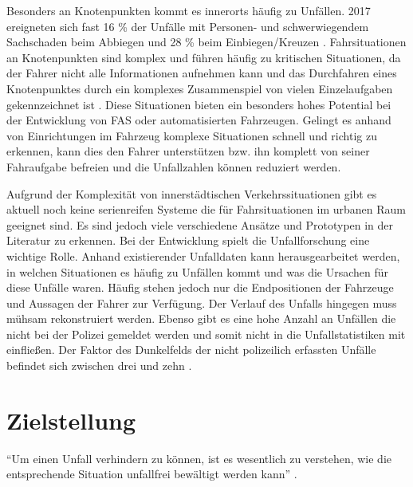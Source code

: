 Besonders an Knotenpunkten kommt es innerorts häufig zu Unfällen. 2017 ereigneten sich fast 16 \% der Unfälle mit Personen- und schwerwiegendem Sachschaden beim Abbiegen und 28 \% beim Einbiegen/Kreuzen \parencite[S. 68]{StatistischesBundesamt.2018b}. Fahrsituationen an Knotenpunkten sind komplex und führen häufig zu kritischen Situationen, da der Fahrer nicht alle Informationen aufnehmen kann \parencite[S. 2]{Gerstenberger.17.02.2015} und das Durchfahren eines Knotenpunktes durch ein komplexes Zusammenspiel von vielen Einzelaufgaben gekennzeichnet ist \parencite[S. 51]{Zademach.24.09.2015}. Diese Situationen bieten ein besonders hohes Potential bei der Entwicklung von FAS oder automatisierten Fahrzeugen. Gelingt es anhand von Einrichtungen im Fahrzeug komplexe Situationen schnell und richtig zu erkennen, kann dies den Fahrer unterstützen bzw. ihn komplett von seiner Fahraufgabe befreien und die Unfallzahlen können reduziert werden. 

Aufgrund der Komplexität von innerstädtischen Verkehrssituationen gibt es aktuell noch keine serienreifen Systeme die für Fahrsituationen im urbanen Raum geeignet sind. Es sind jedoch viele verschiedene Ansätze und Prototypen in der  Literatur zu erkennen. Bei der Entwicklung spielt die Unfallforschung eine wichtige Rolle. Anhand existierender Unfalldaten kann herausgearbeitet werden, in welchen Situationen es häufig zu Unfällen kommt und was die Ursachen für diese Unfälle waren. Häufig stehen jedoch nur die Endpositionen der Fahrzeuge und Aussagen der Fahrer zur Verfügung. Der Verlauf des Unfalls hingegen muss mühsam rekonstruiert werden. Ebenso gibt es eine hohe Anzahl an Unfällen die nicht bei der Polizei gemeldet werden und somit nicht in die Unfallstatistiken mit einfließen. Der Faktor des Dunkelfelds der nicht polizeilich erfassten Unfälle befindet sich zwischen drei und zehn \parencite[S. 151]{Huguenin.2017}.

\section{Zielstellung}
\enquote{Um einen Unfall verhindern zu können, ist es wesentlich zu verstehen, wie die entsprechende Situation unfallfrei bewältigt werden kann} \parencite[S. 8]{Vollrath.2006}.

